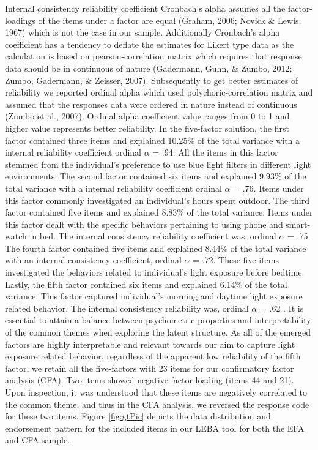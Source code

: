 \documentclass[
  english,
  man]{apa6}
\begin{document}
Internal consistency reliability coefficient Cronbach's alpha assumes all the factor-loadings of the items under a factor are equal (Graham, 2006; Novick \& Lewis, 1967) which is not the case in our sample. Additionally Cronbach's alpha coefficient has a tendency to deflate the estimates for Likert type data as the calculation is based on pearson-correlation matrix which requires that response data should be in continuous of nature (Gadermann, Guhn, \& Zumbo, 2012; Zumbo, Gadermann, \& Zeisser, 2007). Subsequently to get better estimates of reliability we reported ordinal alpha which used polychoric-correlation matrix and assumed that the responses data were ordered in nature instead of continuous (Zumbo et al., 2007). Ordinal alpha coefficient value ranges from 0 to 1 and higher value represents better reliability. In the five-factor solution, the first factor contained three items and explained 10.25\% of the total variance with a internal reliability coefficient ordinal \(\alpha\) = .94. All the items in this factor stemmed from the individual's preference to use blue light filters in different light environments. The second factor contained six items and explained 9.93\% of the total variance with a internal reliability coefficient ordinal \(\alpha\) = .76. Items under this factor commonly investigated an individual's hours spent outdoor. The third factor contained five items and explained 8.83\% of the total variance. Items under this factor dealt with the specific behaviors pertaining to using phone and smart-watch in bed. The internal consistency reliability coefficient was, ordinal \(\alpha\) = .75. The fourth factor contained five items and explained 8.44\% of the total variance with an internal consistency coefficient, ordinal \(\alpha\) = .72. These five items investigated the behaviors related to individual's light exposure before bedtime. Lastly, the fifth factor contained six items and explained 6.14\% of the total variance. This factor captured individual's morning and daytime light exposure related behavior. The internal consistency reliability was, ordinal \(\alpha\) = .62 . It is essential to attain a balance between psychometric properties and interpretability of the common themes when exploring the latent structure. As all of the emerged factors are highly interpretable and relevant towards our aim to capture light exposure related behavior, regardless of the apparent low reliability of the fifth factor, we retain all the five-factors with 23 items for our confirmatory factor analysis (CFA). Two items showed negative factor-loading (items 44 and 21). Upon inspection, it was understood that these items are negatively correlated to the common theme, and thus in the CFA analysis, we reversed the response code for these two items. Figure \ref{fig:gtPic} depicts the data distribution and endorsement pattern for the included items in our LEBA tool for both the EFA and CFA sample.
\end{document}
